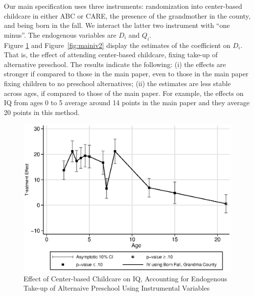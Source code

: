 \begin{appendices}
\noindent Our main specification uses three instruments: randomization into center-based childcare in either ABC or CARE, the presence of the grandmother in the county, and being born in the fall. We interact the latter two instrument with ``one minus''. The endogenous variables are $D_{i}$ and $Q_{i}$.\\

\noindent Figure \ref{fig:main_iv1} and Figure~\ref{fig:mainiv2} display the estimates of the coefficient on $D_{i}$. That is, the effect of attending center-based childcare, fixing take-up of alternative preschool. The results indicate the following: (i) the effects are stronger if compared to those in the main paper, even to those in the main paper fixing children to no preschool alternatives; (ii) the estimates are less stable across ages, if compared to those of the main paper. For example, the effects on IQ from ages 0 to 5 average around 14 points in the main paper and they average 20 points in this method. 

\begin{figure}[H]
		\caption{Effect of Center-based Childcare on IQ, Accounting for Endogenous Take-up of Alternaive Preschool Using Instrumental Variables} \label{fig:main_iv1}
		\includegraphics[width=.5\columnwidth]{output/appendixplots/main_iv_te.eps}
\end{figure}


\end{appendices}
